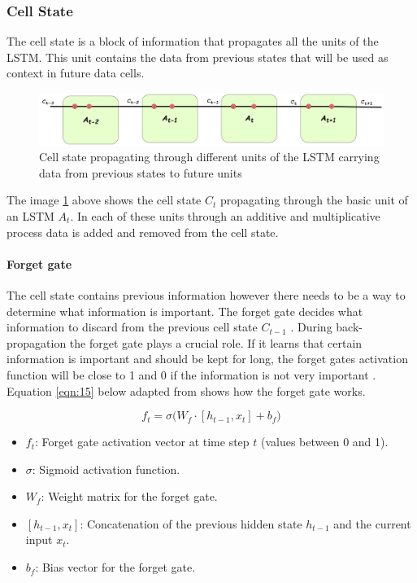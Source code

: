\subsubsection{Cell State}
The cell state is a block of information that propagates all the units of the LSTM. This unit contains the data from previous states that will be used as context in future data cells. \\ 

\begin{figure}[h]
	\centering
	\includegraphics[width=1\linewidth,height=0.1\textwidth]{Chapters/images/cellstate}
	\caption{Cell state propagating through different units of the LSTM carrying data from previous states to future units}
	\label{fig:cellstate}
\end{figure} 

 The image \ref{fig:cellstate} above shows the cell state \textit{$C_{t}$} propagating through the basic unit of an LSTM \textit{$A_t$}. In each of these units through an additive and multiplicative process data is added and removed from the cell state. 
 \paragraph{Forget gate}
 
The cell state contains previous information however there needs to be a way to determine what information is important. The forget gate decides what information to discard from the previous cell state  \textit{$C_{t-1}$} \cite{zhu2025novel}. During back-propagation the forget gate plays a crucial role. If it learns that certain information is important and should be kept for long, the forget gates activation function will be close to 1 and 0 if the information is not very important \cite{zhu2025novel}. Equation \ref{eqn:15}  below adapted from \cite{colah2015understanding} shows how the forget gate works.

\[
f_t = \sigma \Big( W_f \cdot [h_{t-1}, x_t] + b_f \Big)
\label{eqn:15}
\]
{\small
	\begin{itemize}
		\item $f_t$: Forget gate activation vector at time step $t$ (values between 0 and 1).
		\item $\sigma$: Sigmoid activation function.
		\item $W_f$: Weight matrix for the forget gate.
		\item $[h_{t-1}, x_t]$: Concatenation of the previous hidden state $h_{t-1}$ and the current input $x_t$.
		\item $b_f$: Bias vector for the forget gate.
	\end{itemize}
}

